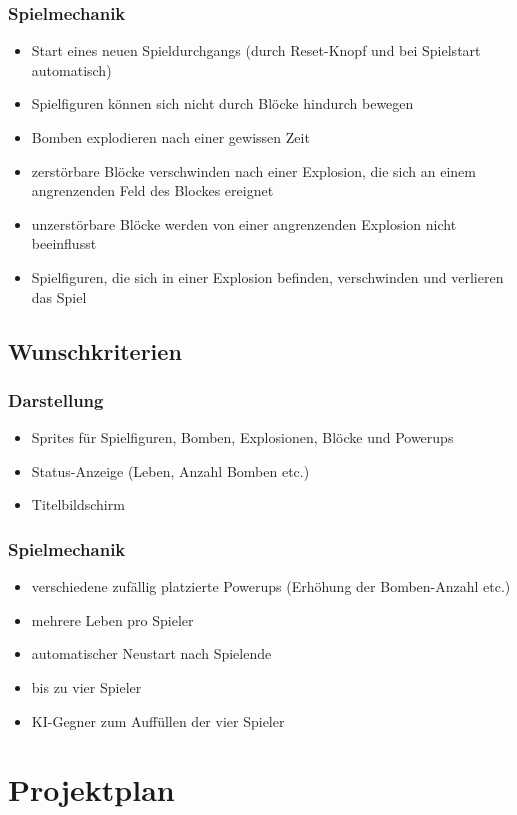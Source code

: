 \documentclass[parskip=full]{scrartcl}
\begin{document}
			\subsubsection{Spielmechanik}
				\begin{itemize}[noitemsep]
					\item Start eines neuen Spieldurchgangs (durch Reset-Knopf und bei Spielstart automatisch)
					\item Spielfiguren können sich nicht durch Blöcke hindurch bewegen
					\item Bomben explodieren nach einer gewissen Zeit
					\item zerstörbare Blöcke verschwinden nach einer Explosion, die sich an einem angrenzenden Feld des Blockes ereignet
					\item unzerstörbare Blöcke werden von einer angrenzenden Explosion nicht beeinflusst
					\item Spielfiguren, die sich in einer Explosion befinden, verschwinden und verlieren das Spiel
				\end{itemize}
		
		\subsection{Wunschkriterien}
			\subsubsection{Darstellung}
			\begin{itemize}[noitemsep]
				\item Sprites für Spielfiguren, Bomben, Explosionen, Blöcke und Powerups 
				\item Status-Anzeige (Leben, Anzahl Bomben etc.)
				\item Titelbildschirm
			\end{itemize}
			
			\subsubsection{Spielmechanik}
			\begin{itemize}[noitemsep]
				\item verschiedene zufällig platzierte Powerups (Erhöhung der Bomben-Anzahl etc.)
				\item mehrere Leben pro Spieler
				\item automatischer Neustart nach Spielende
				\item bis zu vier Spieler
				\item KI-Gegner zum Auffüllen der vier Spieler
			\end{itemize}
	
	\section{Projektplan}

				
\end{document}
